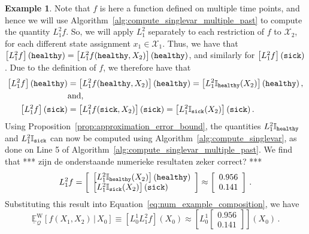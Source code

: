 \documentclass[10pt,a4paper]{paper}
\theoremstyle{definition}
\newtheorem{exmp}{Example}%
\newcommand{\states}{\mathcal{X}}
\newcommand{\ind}[1]{\mathbb{I}_{#1}}
\newcommand{\rateset}{\mathcal{Q}}
\begin{document}
\begin{exmp}
Note that $f$ is here a function defined on multiple time points, and hence we will use Algorithm~\ref{alg:compute_singlevar_multiple_past} to compute the quantity $L_1^2f$. So, we will apply $L_1^2$ separately to each restriction of $f$ to $\states_2$, for each different state assignment $x_1\in\states_1$. Thus, we have that $\left[L_1^2f\right](\text{{\tt healthy}}) = \left[L_1^2f(\text{{\tt healthy}}, X_2)\right](\text{{\tt healthy}})$, and similarly for $\left[L_1^2f\right](\text{{\tt sick}})$. Due to the definition of $f$, we therefore have that
\begin{align*}
\left[L_1^2f\right](\text{{\tt healthy}}) &= \left[L_1^2f(\text{{\tt healthy}}, X_2)\right](\text{{\tt healthy}}) = \left[L_1^2\ind{\text{{\tt healthy}}}(X_2)\right](\text{{\tt healthy}})\,,\\
 &\text{and,} \\
\left[L_1^2f\right](\text{{\tt sick}}) &= \left[L_1^2f(\text{{\tt sick}}, X_2)\right](\text{{\tt sick}}) = \left[L_1^2\ind{\text{{\tt sick}}}(X_2)\right](\text{{\tt sick}})\,.
\end{align*}
Using Proposition~\ref{prop:approximation_error_bound}, the quantities $L_1^2\ind{\text{{\tt healthy}}}$ and $L_1^2\ind{\text{{\tt sick}}}$ can now be computed using Algorithm~\ref{alg:compute_singlevar}, as done on Line 5 of Algorithm~\ref{alg:compute_singlevar_multiple_past}. We find that *** zijn de onderstaande numerieke resultaten zeker correct? ***
\begin{equation*}
L_1^2 f = \left[\begin{array}{l}
\left[L_1^2\ind{\text{{\tt healthy}}}(X_2)\right](\text{{\tt healthy}}) \\
\left[L_1^2\ind{\text{{\tt sick}}}(X_2)\right](\text{{\tt sick}})
\end{array}\right] 
\approx \left[\begin{array}{c}
0.956 \\
0.141
\end{array}\right]\,.
\end{equation*}
Substituting this result into Equation~\eqref{eq:num_example_composition}, we have
\begin{equation*}
\underline{\mathbb{E}}_{\rateset}^\mathrm{W}[f(X_1,X_2)\,\vert\,X_0] \equiv \left[L_0^1L_1^2f\right](X_0) \approx \left[L_0^1 \left[\begin{array}{c}
0.956 \\
0.141
\end{array}\right]\right](X_0)\,.
\end{equation*}

\end{exmp}
\end{document}
